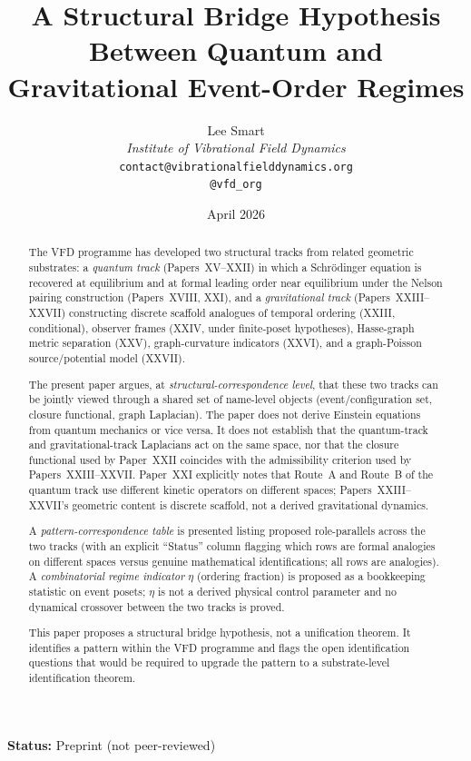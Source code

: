 \documentclass[12pt]{article}
\title{A Structural Bridge Hypothesis\\Between Quantum and Gravitational Event-Order Regimes}
\author{%
  Lee Smart\\[4pt]
  \textit{Institute of Vibrational Field Dynamics}\\[2pt]
  \texttt{contact@vibrationalfielddynamics.org}\\[2pt]
  \texttt{@vfd\_org}%
}
\date{April 2026}
\begin{document}
\maketitle

\noindent\textbf{Status:} Preprint (not peer-reviewed)

\begin{abstract}
The VFD programme has developed two structural tracks from related geometric substrates: a \textit{quantum track} (Papers~XV--XXII) in which a Schr\"odinger equation is recovered at equilibrium and at formal leading order near equilibrium under the Nelson pairing construction (Papers~XVIII, XXI), and a \textit{gravitational track} (Papers~XXIII--XXVII) constructing discrete scaffold analogues of temporal ordering (XXIII, conditional), observer frames (XXIV, under finite-poset hypotheses), Hasse-graph metric separation (XXV), graph-curvature indicators (XXVI), and a graph-Poisson source/potential model (XXVII).

The present paper argues, at \emph{structural-correspondence level}, that these two tracks can be jointly viewed through a shared set of name-level objects (event/configuration set, closure functional, graph Laplacian). The paper does not derive Einstein equations from quantum mechanics or vice versa. It does not establish that the quantum-track and gravitational-track Laplacians act on the same space, nor that the closure functional used by Paper~XXII coincides with the admissibility criterion used by Papers~XXIII--XXVII. Paper~XXI explicitly notes that Route~A and Route~B of the quantum track use different kinetic operators on different spaces; Papers~XXIII--XXVII's geometric content is discrete scaffold, not a derived gravitational dynamics.

A \emph{pattern-correspondence table} is presented listing proposed role-parallels across the two tracks (with an explicit ``Status'' column flagging which rows are formal analogies on different spaces versus genuine mathematical identifications; all rows are analogies). A \emph{combinatorial regime indicator} $\eta$ (ordering fraction) is proposed as a bookkeeping statistic on event posets; $\eta$ is not a derived physical control parameter and no dynamical crossover between the two tracks is proved.

This paper proposes a structural bridge hypothesis, not a unification theorem. It identifies a pattern within the VFD programme and flags the open identification questions that would be required to upgrade the pattern to a substrate-level identification theorem.
\end{abstract}
\end{document}
